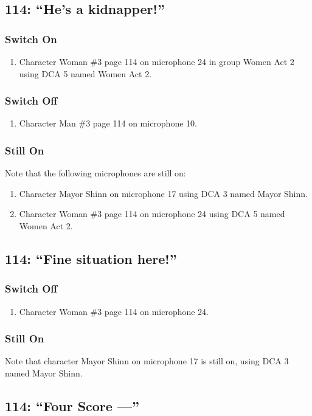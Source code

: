 \subsection* {114: ``He's a kidnapper!''}
\subsubsection* {Switch On}
\begin{enumerate}
\item Character Woman \#3 page 114 on microphone 24 in group Women Act 2 using DCA 5 named Women Act 2.
\end{enumerate}
\subsubsection* {Switch Off}
\begin{enumerate}
\item Character Man \#3 page 114 on microphone 10.
\end{enumerate}
\subsubsection* {Still On}
Note that the following microphones are still on:
\begin{enumerate}
\item Character Mayor Shinn on microphone 17 using DCA 3 named Mayor Shinn.
\item Character Woman \#3 page 114 on microphone 24 using DCA 5 named Women Act 2.
\end{enumerate}
\subsection* {114: ``Fine situation here!''}
\subsubsection* {Switch Off}
\begin{enumerate}
\item Character Woman \#3 page 114 on microphone 24.
\end{enumerate}
\subsubsection* {Still On}
Note that character Mayor Shinn on microphone 17 is still on, using DCA 3 named Mayor Shinn.\subsection* {114: ``Four Score ---''}
